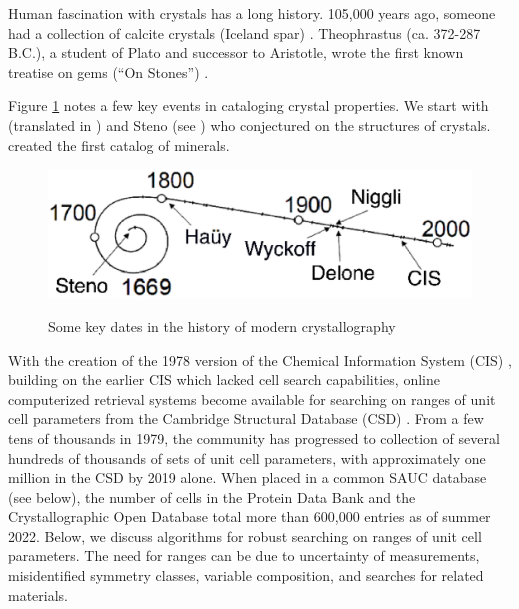 \documentclass[preprint]{iucr}              %
\numberwithin{equation}{section}
\begin{document}
	Human fascination with crystals has a long history. 105,000 years ago,
	someone had a collection of calcite crystals 
	(Iceland spar) \cite{wilkins2021innovative}. 
	Theophrastus (ca. 372-287 B.C.), a student of Plato and successor to Aristotle, wrote the first known treatise on gems (``On Stones'')  \cite{enwiki:1114534722}.
	
	Figure \ref{timeline} notes a few key events in cataloging 
	crystal properties. We start with  (translated in ) and Steno  (see ) who
	conjectured on the structures of crystals.   created the first catalog of minerals.
	
\begin{figure}
	\includegraphics[width=\textwidth]{TimeLine_rev}
	\label{timeline}
	\caption{Some key dates in the history of modern crystallography}
\end{figure}

	With the creation of the 1978 version of the Chemical Information System (CIS)  \cite{bernstein1979nih},
	building on the earlier CIS \cite{feldmann1972application} which lacked cell search capabilities,
	online computerized retrieval systems become
	available for searching on ranges of unit cell parameters from
	the Cambridge Structural Database (CSD) \cite{kennard1977computer}. From 
	a few tens of thousands in 1979, the community has progressed to 
	collection of several hundreds of thousands of sets of
	unit cell parameters, with approximately one million in the
	CSD by 2019 \cite{taylor2019million} alone.  When placed in
	a common SAUC database (see below), the number of cells in the 
	Protein Data Bank and the Crystallographic Open Database total
	more than 600,000 entries as of summer 2022.   Below, we discuss algorithms for 
	robust searching on ranges of unit cell parameters. The need for
	ranges can be due to uncertainty of measurements, misidentified
	symmetry classes, variable composition, and searches for
	related materials.
	
\end{document}
